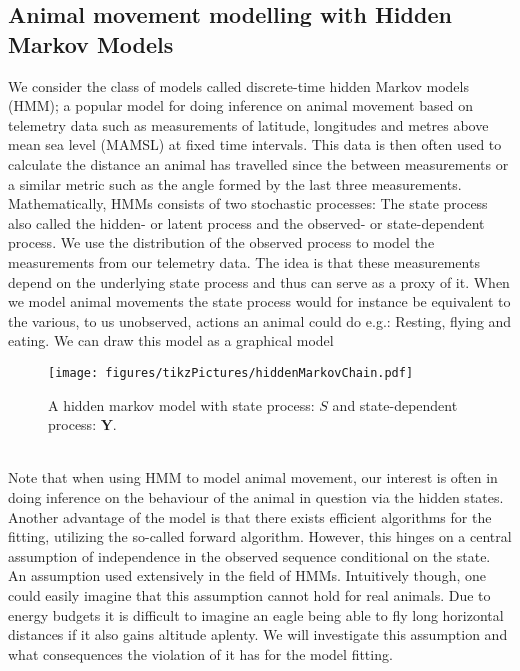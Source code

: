 
\subsection{Animal movement modelling with Hidden Markov Models}
We consider the class of models called discrete-time hidden Markov models (HMM); a popular model for doing inference on animal movement based on telemetry data such as measurements of latitude, longitudes and metres above mean sea level (MAMSL) at fixed time intervals. This data is then often used to calculate the distance an animal has travelled since the between measurements or a similar metric such as the angle formed by the last three measurements.\\ Mathematically, HMMs consists of two stochastic processes: The state process also called the hidden- or latent process and the observed- or state-dependent process. 
We use the distribution of the observed process to model the measurements from our telemetry data. The idea is that these measurements depend on the underlying state process and thus can serve as a proxy of it. When we model animal movements the state process would for instance be equivalent to the various, to us unobserved, actions an animal could do e.g.: Resting, flying and eating. We can draw this model as a graphical model
\begin{figure}[h]
    \centering
    \texttt{[image: figures/tikzPictures/hiddenMarkovChain.pdf]}
    \caption{A hidden markov model with state process: $S$ and state-dependent process: $\mathbf{Y}$.}
\end{figure}\\
Note that when using HMM to model animal movement, our interest is often in doing inference on the behaviour of the animal in question via the hidden states. Another advantage of the model is that there exists efficient algorithms for the fitting, utilizing the so-called forward algorithm. However, this hinges on a central assumption of independence in the observed sequence conditional on the state. An assumption used extensively in the field of HMMs. Intuitively though, one could easily imagine that this assumption cannot hold for real animals. Due to energy budgets it is difficult to imagine an eagle being able to fly long horizontal distances if it also gains altitude aplenty. We will investigate this assumption and what consequences the violation of it has for the model fitting.
